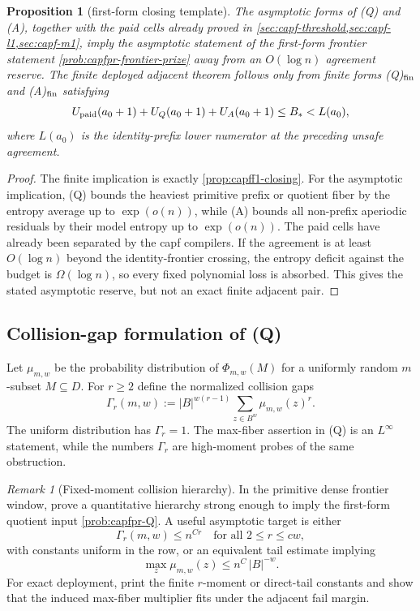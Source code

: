 \documentclass[11pt]{article}
\newtheorem{proposition}[proposition]{Proposition}
\theoremstyle{definition}
\theoremstyle{remark}
\newtheorem{remark}[remark]{Remark}
\newcommand{\B}{B}
\begin{document}
\begin{proposition}[first-form closing template]\label{prop:capfpr-AQ-closing}
The asymptotic forms of \textup{(Q)} and \textup{(A)}, together with the paid cells already proved in \cref{sec:capf-threshold,sec:capf-l1,sec:capf-m1}, imply the asymptotic statement of the first-form frontier statement \cref{prob:capfpr-frontier-prize} away from an $O(\log n)$ agreement reserve.  The finite deployed adjacent theorem follows only from finite forms \textup{(Q)}$_{\rm fin}$ and \textup{(A)}$_{\rm fin}$ satisfying
\[
        U_{\rm paid}(a_0+1)+U_Q(a_0+1)+U_A(a_0+1)\le B_*<L(a_0),
\]
where $L(a_0)$ is the identity-prefix lower numerator at the preceding unsafe agreement.
\end{proposition}

\begin{proof}
The finite implication is exactly \cref{prop:capff1-closing}.  For the asymptotic implication, \textup{(Q)} bounds the heaviest primitive prefix or quotient fiber by the entropy average up to $\exp(o(n))$, while \textup{(A)} bounds all non-prefix aperiodic residuals by their model entropy up to $\exp(o(n))$.  The paid cells have already been separated by the capf compilers.  If the agreement is at least $O(\log n)$ beyond the identity-frontier crossing, the entropy deficit against the budget is $\Omega(\log n)$, so every fixed polynomial loss is absorbed.  This gives the stated asymptotic reserve, but not an exact finite adjacent pair.
\end{proof}

\subsection{Collision-gap formulation of \textup{(Q)}}\label{subsec:capfpr-collision-gap}

Let $\mu_{m,w}$ be the probability distribution of $\Phi_{m,w}(M)$ for a uniformly random $m$-subset $M\subseteq D$.  For $r\ge2$ define the normalized collision gaps
\[
        \Gamma_r(m,w)
        := |\B|^{w(r-1)}\sum_{z\in\B^w}\mu_{m,w}(z)^r .
\]
The uniform distribution has $\Gamma_r=1$.  The max-fiber assertion in \textup{(Q)} is an $L^\infty$ statement, while the numbers $\Gamma_r$ are high-moment probes of the same obstruction.

\begin{remark}[Fixed-moment collision hierarchy]\label{prob:capfpr-collision-gap}
In the primitive dense frontier window, prove a quantitative hierarchy strong enough to imply the first-form quotient input \cref{prob:capfpr-Q}.  A useful asymptotic target is either
\[
        \Gamma_r(m,w)\le n^{C r}
        \quad\text{for all }2\le r\le c w,
\]
with constants uniform in the row, or an equivalent tail estimate implying
\[
        \max_z \mu_{m,w}(z)
        \le n^{C}\,|\B|^{-w}.
\]
For exact deployment, print the finite $r$-moment or direct-tail constants and show that the induced max-fiber multiplier fits under the adjacent fail margin.
\end{remark}
\end{document}
